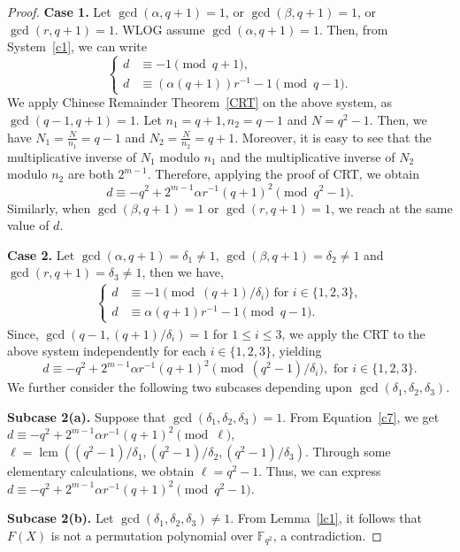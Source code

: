 \documentclass[12pt,reqno]{amsart}
\numberwithin{equation}{section}
\theoremstyle{definition}
\DeclareMathOperator{\lcm}{lcm}
\newcommand{\F}{\mathbb F}
\begin{document}
\begin{proof}
\textbf{Case 1.} Let $\gcd(\alpha,q+1)=1$, or $\gcd(\beta,q+1)=1$, or $\gcd(r,q+1)=1$. WLOG assume $\gcd(\alpha,q+1)=1$. Then, from System~\eqref{c1}, we can write
	\begin{equation*}
		\begin{cases}
			d & \equiv -1 \pmod {q+1}, \\
			d & \equiv (\alpha (q+1))r^{-1}-1 \pmod {q-1} .
		\end{cases}
	\end{equation*}
 We apply Chinese Remainder Theorem~\ref{CRT} on the above system, as $\gcd(q-1,q+1)=1$. Let $n_1=q+1, n_2=q-1$ and $N=q^2-1$. Then, we have $N_1=\frac{N}{n_1}=q-1$ and $N_2=\frac{N}{n_2}=q+1$. Moreover, it is easy to see that the multiplicative inverse of $N_1$ modulo $n_1$ and the multiplicative inverse of $N_2$ modulo $n_2$ are both $2^{m-1}$. Therefore, applying the proof of CRT, we obtain
$$d \equiv -q^2+2^{m-1}\alpha r^{-1}(q+1)^2 \pmod{q^2-1}.$$
Similarly, when $\gcd(\beta,q+1)=1$ or $\gcd(r,q+1)=1$, we reach at the same value of $d$.

\textbf{Case 2.} Let $\gcd(\alpha,q+1)=\delta_1\neq1$, $\gcd(\beta,q+1)=\delta_2\neq1$ and $\gcd(r,q+1)=\delta_3\neq1$, then we have,
\begin{align*}\label{c6}
		\begin{cases}
			d & \equiv -1 \pmod {(q+1)/\delta_i} \text{ for } i \in \{1,2,3\},\\
			d & \equiv \alpha (q+1)r^{-1}-1 \pmod {q-1} .
		\end{cases}
	\end{align*}
Since, $\gcd(q-1,(q+1)/\delta_i)=1$ for $1 \leq i \leq 3$, we apply the CRT to the above system independently for each $i \in \{1,2,3\}$, yielding
\begin{equation}\label{c7}
    d \equiv -q^2+2^{m-1}\alpha r^{-1}(q+1)^2 \pmod{(q^2-1)/\delta_i}, \text{ for } i \in \{1,2,3\}.
\end{equation}
We further consider the following two subcases depending upon $\gcd(\delta_1,\delta_2,\delta_3)$.

\textbf{Subcase 2(a).} Suppose that $\gcd(\delta_1,\delta_2,\delta_3) = 1$. From Equation~\eqref{c7}, we get
$d \equiv -q^2+2^{m-1}\alpha r^{-1}(q+1)^2 \pmod{\ell}$, $\ell=\lcm((q^2-1)/\delta_1, (q^2-1)/\delta_2, (q^2-1)/\delta_3)$. Through some elementary calculations, we obtain $\ell=q^2-1$. Thus, we can express ${d \equiv -q^2+2^{m-1}\alpha r^{-1}(q+1)^2 \pmod{q^2-1}}$.

\textbf{Subcase 2(b).} Let $\gcd(\delta_1,\delta_2, \delta_3) \neq 1$. From Lemma~\ref{lc1}, it follows that $F(X)$ is not a permutation polynomial over $\F_{q^2}$, a contradiction. 


\end{proof}
\end{document}
